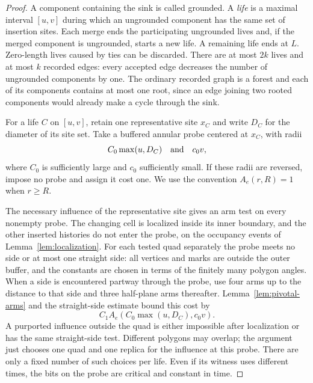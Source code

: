 \begin{proof}
A component containing the sink is called grounded.  A \emph{life} is
a maximal interval $[u,v]$ during which an ungrounded component has the
same set of insertion sites.  Each merge ends the participating
ungrounded lives and, if the merged component is ungrounded, starts a
new life.  A remaining life ends at $L$.  Zero-length lives caused by
ties can be discarded.  There are at most $2k$ lives and at most $k$
recorded edges: every accepted edge decreases the number of
ungrounded components by one.  The ordinary recorded graph is a forest
and each of its components contains at most one root, since an edge
joining two rooted components would already make a cycle through the
sink.

For a life $C$ on $[u,v]$, retain one representative site $x_C$ and
write $D_C$ for the diameter of its site set.  Take a buffered annular
probe centered at $x_C$, with radii
\begin{equation}
                C_0\max(u,D_C)\quad\hbox{and}\quad c_0v,
 \label{eq:life-probe}
\end{equation}
where $C_0$ is sufficiently large and $c_0$ sufficiently small.
If these radii are reversed, impose no probe and assign it cost one.
We use the convention $A_e(r,R)=1$ when $r\geq R$.

The necessary influence of the representative site gives an arm test
on every nonempty probe.  The changing cell is localized inside its
inner boundary, and the other inserted histories do not enter the
probe, on the occupancy events of Lemma~\ref{lem:localization}.
For each tested quad separately the probe meets no side or at most one
straight side: all vertices and marks are outside the outer buffer,
and the constants are chosen in terms of the finitely many polygon
angles.  When a side is encountered partway through the probe, use
four arms up to the distance to that side and three half-plane arms
thereafter.  Lemma~\ref{lem:pivotal-arms} and the straight-side estimate
bound this cost by
\begin{equation}
                  C_1 A_e(C_0\max(u,D_C),c_0v).
 \label{eq:life-arm-cost}
\end{equation}
A purported influence outside the quad is either impossible after
localization or has the same straight-side test.  Different polygons
may overlap; the argument just chooses one quad and one replica for
the influence at this probe.  There are only a fixed number of such
choices per life.  Even if its witness uses different times, the bits
on the probe are critical and constant in time.


\end{proof}
